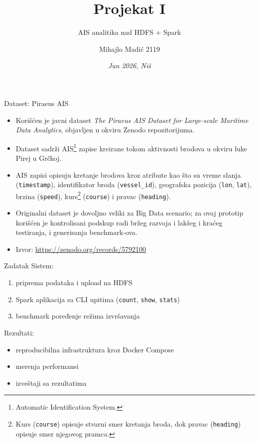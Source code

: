 \documentclass[aspectratio=169,11pt]{beamer}
\title{Projekat I}
\subtitle[AIS analitika nad HDFS + Spark]{AIS analitika nad HDFS + Spark}
\author[Mihajlo Madić 2119]{Mihajlo Madić 2119}
\institute[Big Data Systems]{Big Data Systems}
\date{\small{\textit{Jun 2026, Niš}}}
\newcommand{\code}[1]{\texttt{\small #1}}
\begin{document}
\begin{frame}
  \titlepage
\end{frame}

\begin{frame}{Dataset: Piraeus AIS}
  \begin{itemize}
    \item Korišćen je javni dataset \textit{The Piraeus AIS Dataset for Large-scale Maritime Data Analytics}, objavljen u okviru Zenodo repozitorijuma.
    \item Dataset sadrži AIS\footnote{Automatic Identification System.} zapise kreirane tokom aktivnosti brodova u okviru luke Pirej u Grčkoj.
    \item AIS zapisi opisuju kretanje brodova kroz atribute kao što su vreme slanja (\code{timestamp}), identifikator broda (\code{vessel\_id}), geografska pozicija (\code{lon}, \code{lat}), brzina (\code{speed}), kurs\footnote{Kurs (\code{course}) opisuje stvarni smer kretanja broda, dok pravac (\code{heading}) opisuje smer njegovog pramca.} (\code{course}) i pravac (\code{heading}).
    \item Originalni dataset je dovoljno veliki za Big Data scenario; za ovaj prototip korišćen je kontrolisani podskup radi bržeg razvoja i lakšeg i kraćeg testiranja, i generisanja benchmark-ova.
    \item Izvor: \url{https://zenodo.org/records/5792100}
  \end{itemize}
\end{frame}

\begin{frame}{Zadatak}
  Sistem:
  \begin{enumerate}
    \item priprema podataka i upload na HDFS
    \item Spark aplikacija sa CLI upitima (\code{count}, \code{show}, \code{stats})
    \item benchmark poređenje režima izvršavanja
  \end{enumerate}

  \vspace{0.4cm}
  Rezultati:
  \begin{itemize}
    \item reproducibilna infrastruktura kroz Docker Compose
    \item merenja performansi
    \item izveštaji sa rezultatima
  \end{itemize}
\end{frame}
\end{document}
